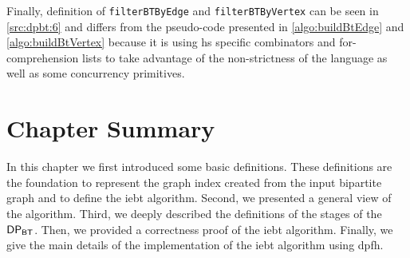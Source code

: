 Finally, definition of \texttt{filterBTByEdge} and \texttt{filterBTByVertex} can be seen in \autoref{src:dpbt:6} and differs 
from the pseudo-code presented in \autoref{algo:buildBtEdge} and \autoref{algo:buildBtVertex} because it is using \acrshort{hs} specific combinators and 
for-comprehension lists to take advantage of the non-strictness of the language as well as some concurrency primitives.

\section{Chapter Summary}
In this chapter we first introduced some basic definitions. These definitions are the foundation to represent the graph index created from the input bipartite graph and to define the \acrshort{iebt} algorithm. Second, we presented a general view of the algorithm. Third, we deeply described the definitions of the  stages  of the $\mathsf{DP_{BT}}$. Then, we provided a correctness proof  of the \acrshort{iebt} algorithm. Finally, we give the main details of the implementation of the \acrshort{iebt} algorithm using \acrshort{dpfh}. 


